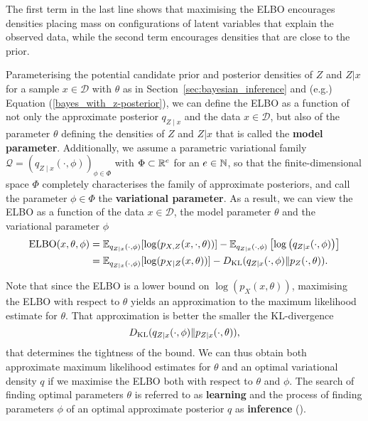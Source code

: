 The first term in the last line shows that maximising the ELBO encourages densities placing mass on configurations of latent variables that explain the observed data, while the second term encourages densities that are close to the prior. 

Parameterising the potential candidate prior and posterior densities of $Z$ and $Z\vert x$ for a sample $x\in\mathcal{D}$ with $\theta$ as in Section~\ref{sec:bayesian_inference} and (e.g.) Equation (\ref{bayes_with_z-posterior}), we can define the ELBO as a function of not only the approximate posterior $q_{Z\mid x}$ and the data $x\in\mathcal{D}$, but also of the parameter $\theta$ defining the densities of $Z$ and $Z\vert x$ that is called the \textbf{model parameter}. Additionally, we assume a parametric variational family $\mathcal{Q} = (q_{Z\mid x}(\cdot, \phi))_{\phi \in \Phi}$ with $\Phi \subset \mathbb{R}^e$ for an $e\in \mathbb{N}$, so that the finite-dimensional space $\Phi$ completely characterises the family of approximate posteriors, and call the parameter $\phi \in \Phi$ the \textbf{variational parameter}. 
As a result, we can view the ELBO as a function of the data $x\in \mathcal{D}$, the model parameter $\theta$ and the variational parameter $\phi$ 
\begin{equation}\label{elbo-as-function-of-theta-and-phi}
\begin{split}
	\mathrm{ELBO}(x,\theta, \phi) &= \mathbb{E}_{q_{Z\mid x}(\cdot,\phi)}[\log(p_{X,Z}(x, \cdot, \theta))] - \mathbb{E}_{q_{Z\mid x}(\cdot,\phi)}\left[\log\left(q_{Z\mid x}(\cdot, \phi)\right)\right] \\
	&= \mathbb{E}_{q_{Z\mid x}(\cdot,\phi)}[\log(p_{X\mid Z}(x,\theta))] - D_{\mathrm{KL}}(q_{Z\mid x}(\cdot,\phi)\Vert p_{Z}(\cdot,\theta)).
\end{split}
\end{equation}

Note that since the ELBO is a lower bound on $\log(p_{X}(x,\theta))$, maximising the ELBO with respect to $\theta$ yields an approximation to the maximum likelihood estimate for $\theta$. That approximation is better the smaller the KL-divergence 
$$D_{\mathrm{KL}}(q_{Z\mid x}(\cdot,\phi)\Vert p_{Z\mid x}(\cdot,\theta)),$$ 
that determines the tightness of the bound. We can thus obtain both approximate maximum likelihood estimates for $\theta$ and an optimal variational density $q$ if we maximise the ELBO both with respect to $\theta$ and $\phi$. The search of finding optimal parameters $\theta$ is referred to as \textbf{learning} and the process of finding parameters $\phi$ of an optimal approximate posterior $q$ as \textbf{inference} (\cite[p.~15]{Kingma2019}).

